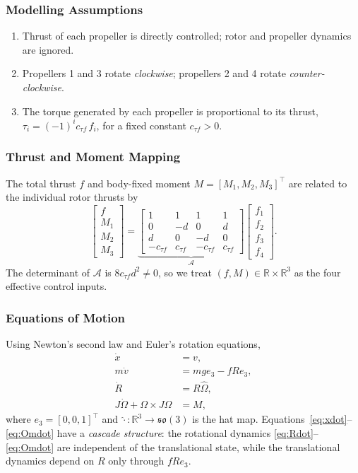 \documentclass[11pt]{article}
\theoremstyle{remark}
\newcommand{\so}{\mathfrak{so}(3)}
\newcommand{\R}{\mathbb{R}}
\newcommand{\hatmap}[1]{\widehat{#1}}
\begin{document}
\subsubsection{Modelling Assumptions}
\begin{enumerate}
    \item Thrust of each propeller is directly controlled; rotor and propeller dynamics are ignored.
    \item Propellers 1 and 3 rotate \emph{clockwise}; propellers 2 and 4 rotate \emph{counter-clockwise}.
    \item The torque generated by each propeller is proportional to its thrust, $\tau_i = (-1)^i c_{\tau f}\, f_i$, for a fixed constant $c_{\tau f}>0$.
\end{enumerate}

\subsubsection{Thrust and Moment Mapping}
The total thrust $f$ and body-fixed moment $M = [M_1, M_2, M_3]^\top$ are related to the individual rotor thrusts by
\[
    \begin{bmatrix} f \\ M_1 \\ M_2 \\ M_3 \end{bmatrix}
    =
    \underbrace{\begin{bmatrix}
        1 & 1 & 1 & 1 \\
        0 & -d & 0 & d \\
        d & 0 & -d & 0 \\
        -c_{\tau f} & c_{\tau f} & -c_{\tau f} & c_{\tau f}
    \end{bmatrix}}_{\mathcal A}
    \begin{bmatrix} f_1 \\ f_2 \\ f_3 \\ f_4 \end{bmatrix}.
\]
The determinant of $\mathcal A$ is $8 c_{\tau f} d^2 \neq 0$, so we treat $(f, M) \in \R \times \R^3$ as the four effective control inputs.

\subsubsection{Equations of Motion}
Using Newton's second law and Euler's rotation equations,
\begin{align}
    \dot{x} &= v, \label{eq:xdot}\\
    m\dot{v} &= mge_3 - f R e_3, \label{eq:vdot}\\
    \dot{R} &= R\hatmap{\Omega}, \label{eq:Rdot}\\
    J\dot{\Omega} + \Omega \times J\Omega &= M, \label{eq:Omdot}
\end{align}
where $e_3 = [0, 0, 1]^\top$ and $\hatmap{\cdot}: \R^3 \to \so$ is the hat map. Equations~\eqref{eq:xdot}--\eqref{eq:Omdot} have a \emph{cascade structure}: the rotational dynamics \eqref{eq:Rdot}--\eqref{eq:Omdot} are independent of the translational state, while the translational dynamics depend on $R$ only through $fRe_3$.
\end{document}
